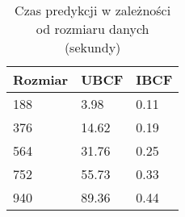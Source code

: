 \begin{table}
	\centering
    \begin{tabular}{lll}
    Rozmiar & UBCF  & IBCF \\
    \hline
    188     & 3.98  & 0.11 \\
    376     & 14.62 & 0.19 \\
    564     & 31.76 & 0.25 \\
    752     & 55.73 & 0.33 \\
    940     & 89.36 & 0.44 \\
    \end{tabular}
    \caption{Czas predykcji w zależności od rozmiaru danych (sekundy)}
\end{table}